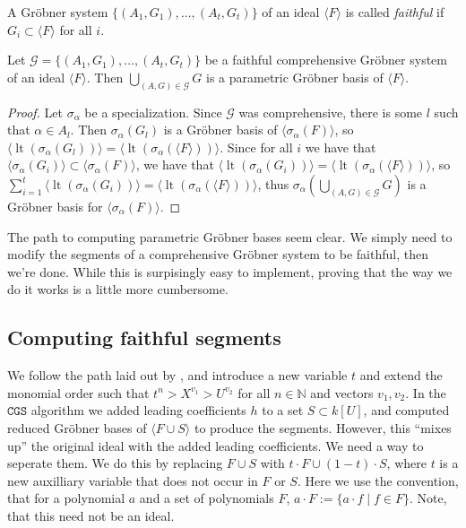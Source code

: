 \documentclass[a4paper, 12pt]{article}
\newcommand{\N}{\mathbb{N}}
\DeclareMathOperator{\LT}{lt}
\theoremstyle{changedot}
\theoremstyle{changedotbreak}
\theoremstyle{nonumberplain}
\newtheorem{proof}{Proof}
\begin{document}
\begin{definition}
  A Gröbner system $\{(A_{1}, G_{1}), \dots, (A_{t}, G_{t})\}$ of an ideal $\langle F \rangle$ is called \textit{faithful} if $G_{i} \subset \langle F \rangle$ for all $i$.
\end{definition}

\begin{corollary}\label{cor:faithful_cgs_to_cgb}
  Let $\mathcal G = \{(A_{1}, G_{1}), \dots, (A_{t}, G_{t})\}$ be a faithful comprehensive Gröbner system of an ideal $\langle F \rangle$. Then $\bigcup_{(A, G) \in \mathcal G} G$ is a parametric Gröbner basis of $\langle F \rangle$.
\end{corollary}
\begin{proof}
  Let $\sigma_{\alpha}$ be a specialization. Since $\mathcal G$ was comprehensive, there is some $l$ such that $\alpha \in A_{l}$. Then $\sigma_{\alpha}(G_{l})$ is a Gröbner basis of $\langle \sigma_{\alpha}(F) \rangle$, so $\langle \LT(\sigma_{\alpha}(G_{l})) \rangle = \langle \LT(\sigma_{\alpha}(\langle F \rangle)) \rangle$. Since for all $i$ we have that $\langle \sigma_{\alpha}(G_{i}) \rangle \subset \langle \sigma_{\alpha}(F) \rangle$, we have that $\langle \LT(\sigma_{\alpha}(G_{i})) \rangle = \langle \LT(\sigma_{\alpha}(\langle F \rangle)) \rangle$, so $\sum_{i=1}^{t} \langle \LT(\sigma_{\alpha}(G_{i})) \rangle = \langle \LT(\sigma_{\alpha}(\langle F \rangle)) \rangle$, thus $\sigma_{\alpha}\left(\bigcup_{(A, G) \in \mathcal G} G\right)$ is a Gröbner basis for $\langle \sigma_{\alpha}(F) \rangle$.
\end{proof}

The path to computing parametric Gröbner bases seem clear. We simply need to modify the segments of a comprehensive Gröbner system to be faithful, then we're done. While this is surpisingly easy to implement, proving that the way we do it works is a little more cumbersome.

\subsection{Computing faithful segments}

We follow the path laid out by \cite{ss_algo}, and introduce a new variable $t$ and extend the monomial order such that $t^{n} > X^{v_{1}} > U^{v_{2}}$ for all $n \in \N$ and vectors $v_{1}, v_{2}$. In the $\mathtt{CGS}$ algorithm we added leading coefficients $h$ to a set $S \subset k[U]$, and computed reduced Gröbner bases of $\langle F \cup S \rangle$ to produce the segments. However, this ``mixes up'' the original ideal with the added leading coefficients. We need a way to seperate them. We do this by replacing $F \cup S$ with $t\cdot F \cup (1-t)\cdot S$, where $t$ is a new auxilliary variable that does not occur in $F$ or $S$. Here we use the convention, that for a polynomial $a$ and a set of polynomials $F$, $a\cdot F := \{a \cdot f \mid f \in F\}$. Note, that this need not be an ideal.
\end{document}
